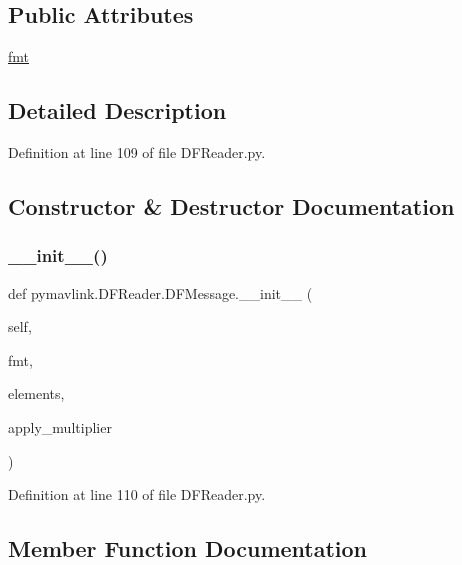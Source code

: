 \subsection*{Public Attributes}
\begin{DoxyCompactItemize}
\item 
\mbox{\hyperlink{classpymavlink_1_1DFReader_1_1DFMessage_a8f37e80929b490f8f9914e5c01fc7800}{fmt}}
\end{DoxyCompactItemize}


\subsection{Detailed Description}


Definition at line 109 of file D\+F\+Reader.\+py.



\subsection{Constructor \& Destructor Documentation}
\mbox{\label{classpymavlink_1_1DFReader_1_1DFMessage_a783e0f90a8f515f7f7e7205a4a3c36c5}} 
\subsubsection{\texorpdfstring{\_\_init\_\_()}{\_\_init\_\_()}}
{\footnotesize\ttfamily def pymavlink.\+D\+F\+Reader.\+D\+F\+Message.\+\_\+\+\_\+init\+\_\+\+\_\+ (\begin{DoxyParamCaption}\item[{}]{self,  }\item[{}]{fmt,  }\item[{}]{elements,  }\item[{}]{apply\+\_\+multiplier }\end{DoxyParamCaption})}



Definition at line 110 of file D\+F\+Reader.\+py.



\subsection{Member Function Documentation}
\mbox{\label{classpymavlink_1_1DFReader_1_1DFMessage_aeda9e43b0ace0421511eacc1b8701464}} 

